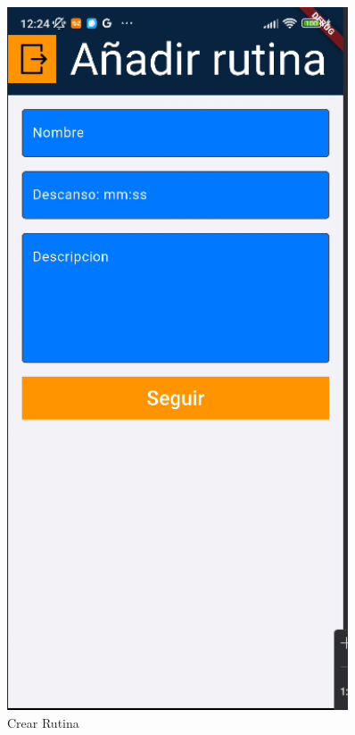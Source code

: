 \begin{figure}[H]
\begin{minipage}{0.35\textwidth}
      \centering
      \includegraphics[width=0.9\textwidth]{pantallas/crearRutina.png}
      \caption{Crear Rutina}
      \label{fig:crearRutina}
   \end{minipage}
\end{figure}

